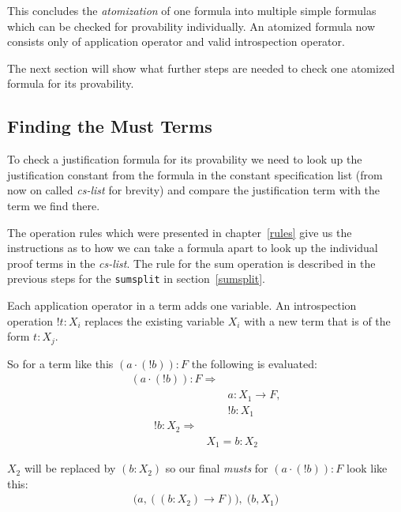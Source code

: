 This concludes the \emph{atomization} of one formula into multiple simple formulas which can be checked for provability individually. An atomized formula now consists only of application operator and valid introspection operator. 

The next section will show what further steps are needed to check one atomized formula for its provability.

\subsection{Finding the Must Terms}\label{chap:Algorithm.musts}
To check a justification formula for its provability we need to look up the justification constant from the formula in the constant specification list (from now on called \emph{cs-list} for brevity) and compare the justification term with the term we find there.

The operation rules which were presented in chapter~\ref{rules} give us the instructions as to how we can take a formula apart to look up the individual proof terms in the \emph{cs-list}. The rule for the sum operation is described in the previous steps for the \texttt{sumsplit} in section~\ref{sumsplit}.

Each application operator in a term adds one variable. An introspection operation $!t:X_i$ replaces the existing variable $X_i$ with a new term that is of the form $t:X_j$. 

So for a term like this $(a \cdot (!b)):F$ the following is evaluated:
\begin{equation}\label{musts1}
\begin{split}
	(a \cdot (!b)): F \Rightarrow\\
	&  a: X_1 \rightarrow F,\\
	& !b: X_1
\end{split}
\end{equation}
\begin{equation}\label{musts2}
\begin{split}
	!b: X_2 \Rightarrow\\
	& X_1 = b:X_2
\end{split}
\end{equation}

$X_2$ will be replaced by $(b:X_2)$ so our final \emph{musts} for $(a \cdot (!b)):F$ look like this: 
\begin{align*}\label{must-list}
 \bigl( a, ((b:X_2) \rightarrow  F) \bigr) ,\; \bigl( b, X_1 \bigr) 
\end{align*}

